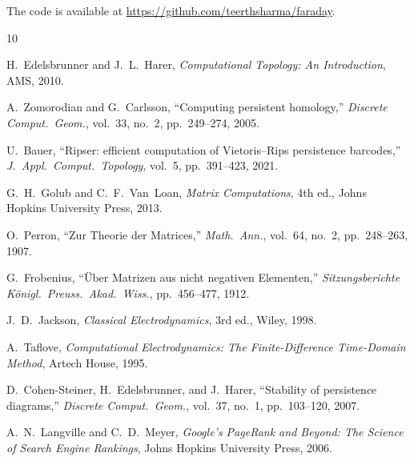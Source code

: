 \documentclass[11pt,twocolumn]{article}
\begin{document}
The code is available at
\url{https://github.com/teerthsharma/faraday}.

\begin{thebibliography}{10}

H.~Edelsbrunner and J.~L.~Harer,
\emph{Computational Topology: An Introduction},
AMS, 2010.

A.~Zomorodian and G.~Carlsson,
``Computing persistent homology,''
\emph{Discrete Comput.\ Geom.}, vol.~33, no.~2, pp.~249--274, 2005.

U.~Bauer,
``Ripser: efficient computation of Vietoris--Rips persistence barcodes,''
\emph{J.\ Appl.\ Comput.\ Topology}, vol.~5, pp.~391--423, 2021.

G.~H.~Golub and C.~F.~Van~Loan,
\emph{Matrix Computations}, 4th ed.,
Johns Hopkins University Press, 2013.

O.~Perron,
``Zur Theorie der Matrices,''
\emph{Math.\ Ann.}, vol.~64, no.~2, pp.~248--263, 1907.

G.~Frobenius,
``\"Uber Matrizen aus nicht negativen Elementen,''
\emph{Sitzungsberichte K\"onigl.\ Preuss.\ Akad.\ Wiss.}, pp.~456--477, 1912.

J.~D.~Jackson,
\emph{Classical Electrodynamics}, 3rd ed.,
Wiley, 1998.

A.~Taflove,
\emph{Computational Electrodynamics: The Finite-Difference Time-Domain Method},
Artech House, 1995.

D.~Cohen-Steiner, H.~Edelsbrunner, and J.~Harer,
``Stability of persistence diagrams,''
\emph{Discrete Comput.\ Geom.}, vol.~37, no.~1, pp.~103--120, 2007.

A.~N.~Langville and C.~D.~Meyer,
\emph{Google's PageRank and Beyond: The Science of Search Engine Rankings},
Johns Hopkins University Press, 2006.

\end{thebibliography}
\end{document}

